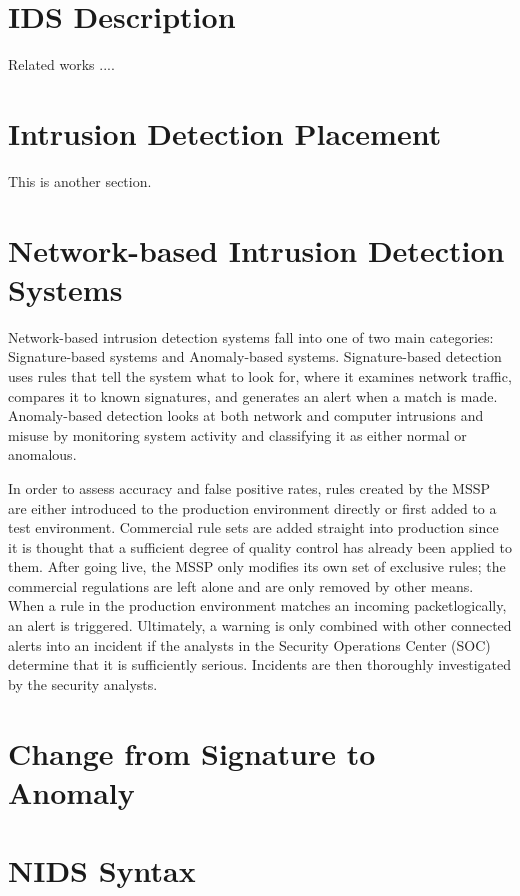 \section{IDS Description}
\label{sec:related}

Related works .... 



\section{Intrusion Detection Placement}

This is another section. 

\section{Network-based Intrusion Detection Systems}

Network-based intrusion detection systems fall into one of two main categories: Signature-based systems and Anomaly-based systems. Signature-based detection uses rules that tell the system what to look for, where it examines network traffic, compares it to known signatures, and generates an alert when a match is made. Anomaly-based detection looks at both network and computer intrusions and misuse by monitoring system activity and classifying it as either normal or anomalous.

In order to assess accuracy and false positive rates, rules created by the MSSP are either introduced to the production environment directly or first added to a test environment. Commercial rule sets are added straight into production since it is thought that a sufficient degree of quality control has already been applied to them. After going live, the MSSP only modifies its own set of exclusive rules; the commercial regulations are left alone and are only removed by other means. When a rule in the production environment matches an incoming packetlogically, an alert is triggered. Ultimately, a warning is only combined with other connected alerts into an incident if the analysts in the Security Operations Center (SOC) determine that it is sufficiently serious. Incidents are then thoroughly investigated by the security analysts.

\section{Change from Signature to Anomaly}
\section{NIDS Syntax}

